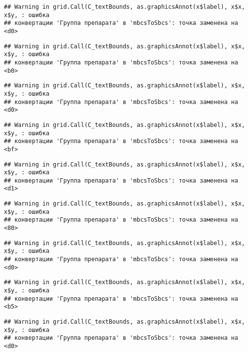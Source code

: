 \documentclass[
]{article}
\begin{document}
\begin{verbatim}
## Warning in grid.Call(C_textBounds, as.graphicsAnnot(x$label), x$x, x$y, : ошибка
## конвертации 'Группа препарата' в 'mbcsToSbcs': точка заменена на <d0>
\end{verbatim}

\begin{verbatim}
## Warning in grid.Call(C_textBounds, as.graphicsAnnot(x$label), x$x, x$y, : ошибка
## конвертации 'Группа препарата' в 'mbcsToSbcs': точка заменена на <b0>
\end{verbatim}

\begin{verbatim}
## Warning in grid.Call(C_textBounds, as.graphicsAnnot(x$label), x$x, x$y, : ошибка
## конвертации 'Группа препарата' в 'mbcsToSbcs': точка заменена на <d0>
\end{verbatim}

\begin{verbatim}
## Warning in grid.Call(C_textBounds, as.graphicsAnnot(x$label), x$x, x$y, : ошибка
## конвертации 'Группа препарата' в 'mbcsToSbcs': точка заменена на <bf>
\end{verbatim}

\begin{verbatim}
## Warning in grid.Call(C_textBounds, as.graphicsAnnot(x$label), x$x, x$y, : ошибка
## конвертации 'Группа препарата' в 'mbcsToSbcs': точка заменена на <d1>
\end{verbatim}

\begin{verbatim}
## Warning in grid.Call(C_textBounds, as.graphicsAnnot(x$label), x$x, x$y, : ошибка
## конвертации 'Группа препарата' в 'mbcsToSbcs': точка заменена на <80>
\end{verbatim}

\begin{verbatim}
## Warning in grid.Call(C_textBounds, as.graphicsAnnot(x$label), x$x, x$y, : ошибка
## конвертации 'Группа препарата' в 'mbcsToSbcs': точка заменена на <d0>
\end{verbatim}

\begin{verbatim}
## Warning in grid.Call(C_textBounds, as.graphicsAnnot(x$label), x$x, x$y, : ошибка
## конвертации 'Группа препарата' в 'mbcsToSbcs': точка заменена на <b5>
\end{verbatim}

\begin{verbatim}
## Warning in grid.Call(C_textBounds, as.graphicsAnnot(x$label), x$x, x$y, : ошибка
## конвертации 'Группа препарата' в 'mbcsToSbcs': точка заменена на <d0>
\end{verbatim}
\end{document}
